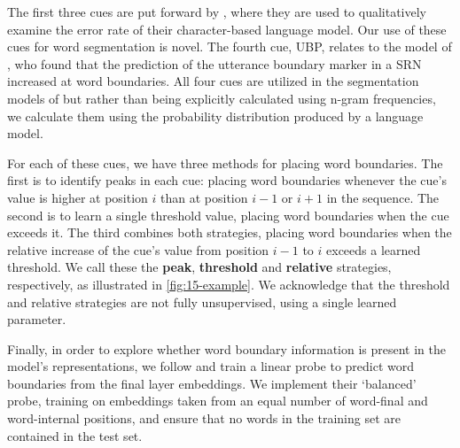 The first three cues are put forward by \citet{al-rfou_character-level_2019}, where they are used to qualitatively examine the error rate of their character-based language model. Our use of these cues for word segmentation is novel. The fourth cue, UBP, relates to the model of \citet{christiansen1998learning}, who found that the prediction of the utterance boundary marker in a SRN increased at word boundaries. All four cues are utilized in the segmentation models of \citet{ccoltekin2014explicit, goriely2023word} but rather than being explicitly calculated using n-gram frequencies, we calculate them using the probability distribution produced by a language model.

For each of these cues, we have three methods for placing word boundaries. The first is to identify peaks in each cue: placing word boundaries whenever the cue's value is higher at position $i$ than at position $i-1$ or $i+1$ in the sequence. The second is to learn a single threshold value, placing word boundaries when the cue exceeds it. The third combines both strategies, placing word boundaries when the relative increase of the cue's value from position $i-1$ to $i$ exceeds a learned threshold. We call these the \textbf{peak}, \textbf{threshold} and \textbf{relative} strategies, respectively, as illustrated in \cref{fig:15-example}. We acknowledge that the threshold and relative strategies are not fully unsupervised, using a single learned parameter. %

Finally, in order to explore whether word boundary information is present in the model's representations, we follow \citet{hahn-baroni-2019-tabula} and train a linear probe to predict word boundaries from the final layer embeddings. We implement their `balanced' probe, training on embeddings taken from an equal number of word-final and word-internal positions, and ensure that no words in the training set are contained in the test set. %



